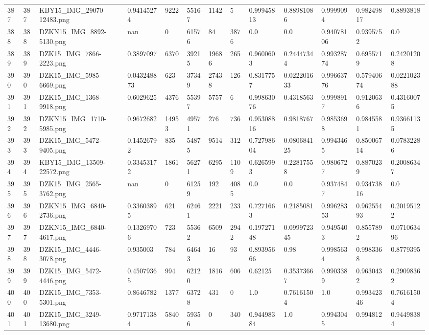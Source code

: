 \documentclass[11pt, a4paper, twoside]{report}
\begin{document}
\begin{longtable}[c]{@{}lllllllllllll@{}}
387 & 387 & KBY15\_IMG\_29070-12483.png & 0.94145274 & 9222 & 55167 & 1142 & 5 & 0.99945813 & 0.88981086 & 0.9999094 & 0.98249817 & 0.8893818 \\
388 & 388 & DZKN15\_IMG\_8892-5130.png & nan & 0 & 61576 & 84 & 3876 & 0.0 & 0.0 & 0.94078106 & 0.9395752 & 0.0 \\
389 & 389 & DZK15\_IMG\_7866-2223.png & 0.3897097 & 6370 & 39215 & 19686 & 265 & 0.9600603 & 0.24447344 & 0.99328774 & 0.6955719 & 0.24201208 \\
390 & 390 & DZK15\_IMG\_5985-6669.png & 0.043248873 & 623 & 37349 & 27438 & 126 & 0.8317757 & 0.022201633 & 0.99663776 & 0.57940674 & 0.022102388 \\
391 & 391 & DZK15\_IMG\_1368-9918.png & 0.6029625 & 4376 & 55397 & 5757 & 6 & 0.99863076 & 0.4318563 & 0.9998917 & 0.9120636 & 0.43160075 \\
392 & 392 & DZKN15\_IMG\_1710-5985.png & 0.9672682 & 14953 & 49571 & 276 & 736 & 0.95308816 & 0.9818767 & 0.9853698 & 0.9845581 & 0.93661135 \\
393 & 393 & DZK15\_IMG\_5472-9405.png & 0.14526792 & 835 & 54875 & 9514 & 312 & 0.72798604 & 0.080684125 & 0.9943465 & 0.85006714 & 0.07832286 \\
394 & 394 & KBY15\_IMG\_13509-22572.png & 0.33453172 & 1861 & 56271 & 6295 & 1109 & 0.6265993 & 0.22817558 & 0.9806727 & 0.8870239 & 0.20086347 \\
395 & 395 & DZK15\_IMG\_2565-3762.png & nan & 0 & 61259 & 192 & 4085 & 0.0 & 0.0 & 0.9374847 & 0.93473816 & 0.0 \\
396 & 396 & DZKN15\_IMG\_6840-2736.png & 0.33603895 & 621 & 62461 & 2221 & 233 & 0.7271663 & 0.2185081 & 0.99628353 & 0.96255493 & 0.20195122 \\
397 & 397 & DZKN15\_IMG\_6840-4617.png & 0.13269706 & 723 & 55362 & 6509 & 2942 & 0.19727148 & 0.099972345 & 0.9495403 & 0.8557892 & 0.071063496 \\
398 & 398 & DZK15\_IMG\_4446-3078.png & 0.935003 & 784 & 64643 & 16 & 93 & 0.89395666 & 0.98 & 0.9985634 & 0.9983368 & 0.8779395 \\
399 & 399 & DZK15\_IMG\_5472-4446.png & 0.45079365 & 994 & 62120 & 1816 & 606 & 0.62125 & 0.35373667 & 0.9903389 & 0.9630432 & 0.29098362 \\
400 & 400 & DZK15\_IMG\_7353-5301.png & 0.8646782 & 1377 & 63728 & 431 & 0 & 1.0 & 0.76161504 & 1.0 & 0.99342346 & 0.76161504 \\
401 & 401 & DZK15\_IMG\_3249-13680.png & 0.97171384 & 5840 & 59356 & 0 & 340 & 0.94498384 & 1.0 & 0.9943045 & 0.994812 & 0.94498384 \\

\end{longtable}
\end{document}
